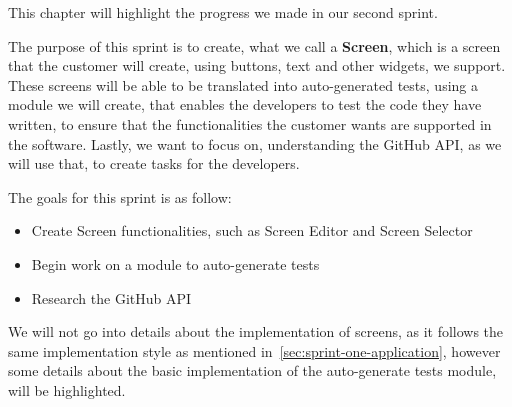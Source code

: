 This chapter will highlight the progress we made in our second sprint.

The purpose of this sprint is to create, what we call a \textbf{Screen}, which is a screen that the customer will create, using buttons, text and other widgets, we support.
These screens will be able to be translated into auto-generated tests, using a module we will create, that enables the developers to test the code they have written, to ensure that the functionalities the customer wants are supported in the software.
Lastly, we want to focus on, understanding the GitHub API, as we will use that, to create tasks for the developers.

The goals for this sprint is as follow:

\begin{itemize}
    \item Create Screen functionalities, such as Screen Editor and Screen Selector
    \item Begin work on a module to auto-generate tests
    \item Research the GitHub API
\end{itemize}

We will not go into details about the implementation of screens, as it follows the same implementation style as mentioned in~\autoref{sec:sprint-one-application}, however some details about the basic implementation of the auto-generate tests module, will be highlighted.
